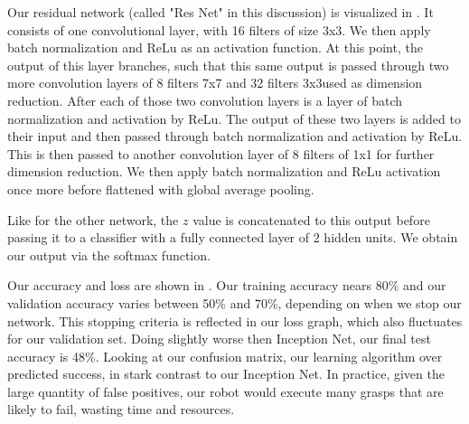 Our residual network (called "Res Net" in this discussion) is visualized in . 
It consists of one convolutional layer, with 16 filters of size 3x3.
We then apply batch normalization and ReLu as an activation function.
At this point, the output of this layer branches, such that this same output is passed through two more convolution layers of 8 filters 7x7 and 32 filters 3x3used as dimension reduction. 
After each of those two convolution layers is a layer of batch normalization and activation by ReLu.
The output of these two layers is added to their input and then passed through batch normalization and activation by ReLu.
This is then passed to another convolution layer of 8 filters of 1x1 for further dimension reduction. 
We then apply batch normalization and ReLu activation once more before flattened with global average pooling. 

Like for the other network, the $z$ value is concatenated to this output before passing it to a classifier with a fully connected layer of 2 hidden units.
We obtain our output via the softmax function.

Our accuracy and loss are shown in . 
Our training accuracy nears 80\% and our validation accuracy varies between 50\% and 70\%, depending on when we stop our network. 
This stopping criteria is reflected in our loss graph, which also fluctuates for our validation set. 
Doing slightly worse then Inception Net, our final test accuracy is 48\%. 
Looking at our confusion matrix, our learning algorithm over predicted success, in stark contrast to our Inception Net. 
In practice, given the large quantity of false positives, our robot would execute many grasps that are likely to fail, wasting time and resources. 

